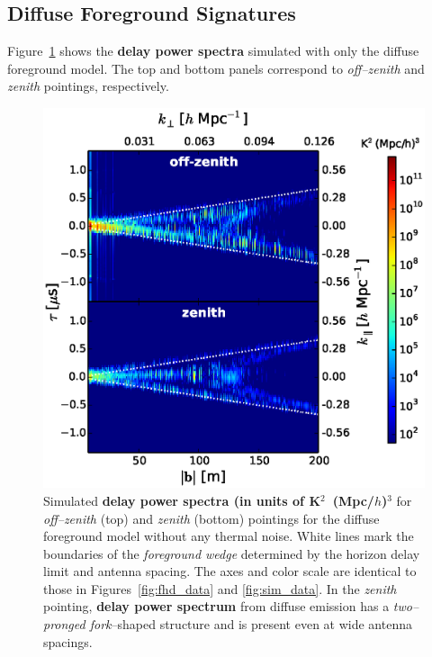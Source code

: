 \documentclass[preprint2,iop,numberedappendix]{emulateapj}
\begin{document}
\subsection{Diffuse Foreground Signatures}\label{sec:diffuse}

Figure~\ref{fig:noiseless-dsm-delay-spectrum} shows the {\bf delay power spectra} simulated with only the diffuse foreground model. The top and bottom panels correspond to {\it off--zenith} and {\it zenith} pointings, respectively. 

\begin{figure}[htb]
\centering
\includegraphics[width=\linewidth]{fig8.eps}
\caption{Simulated {\bf delay power spectra (in units of K$^2$~(Mpc/$h$)$^3$} for {\it off--zenith} (top) and {\it zenith} (bottom) pointings for the diffuse foreground model without any thermal noise. White lines mark the boundaries of the {\it foreground wedge} determined by the horizon delay limit and antenna spacing. The axes and color scale are identical to those in Figures~\ref{fig:fhd_data} and \ref{fig:sim_data}. In the {\it zenith} pointing, {\bf delay power spectrum} from diffuse emission has a {\it two--pronged fork}--shaped structure and is present even at wide antenna spacings. \label{fig:noiseless-dsm-delay-spectrum}}
\end{figure}
\end{document}
